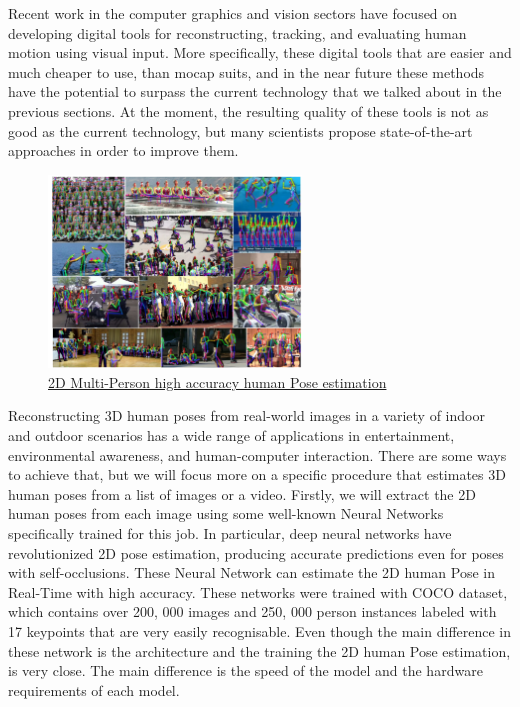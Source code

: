 Recent work in the computer graphics and vision sectors have focused on developing digital tools for reconstructing, tracking, and evaluating human motion using visual input. More specifically, these digital tools that are easier and much cheaper to use, than mocap suits, and in the near future these methods have the potential to surpass the current technology that we talked about in the previous sections. At the moment, the resulting quality of these tools is not as good as the current technology, but many scientists propose state-of-the-art approaches in order to improve them.\\  

\pagebreak

 \begin{figure}[h]
	\centering
	\includegraphics[width=0.6\textwidth]{figures/background/2D.png}
	\captionsetup{labelformat=empty}
	\caption{\href{https://openaccess.thecvf.com/content_cvpr_2017/papers/Cao_Realtime_Multi-Person_2D_CVPR_2017_paper.pdf}
	{2D Multi-Person high accuracy human Pose estimation}}
\end{figure}

Reconstructing 3D human poses from real-world images in a variety of indoor and outdoor scenarios has a wide range of applications in entertainment, environmental awareness, and human-computer interaction. There are some ways to achieve that, but we will focus more on a specific procedure that estimates 3D human poses from a list of images or a video. Firstly, we will extract the 2D human poses from each image using some well-known Neural Networks specifically trained for this job. In particular, deep neural networks \cite{OpenPose,HrNet,AlphaPose} have revolutionized  2D pose estimation, producing accurate predictions even for poses with self-occlusions. These Neural Network can estimate the 2D human Pose in Real-Time with  high accuracy. These networks were trained with COCO dataset,  which contains over 200, 000 images and 250, 000 person instances labeled with 17 keypoints that are very easily recognisable. Even though the main difference in these network is the architecture and the training the 2D human Pose estimation, is very close. The main difference is the speed of the model and the hardware requirements of each model.\\

